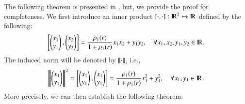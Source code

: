 \documentclass{article}
\newcommand{\Reals}[1]{{\rm I\! R}^{#1}}
\newcommand{\vertiii}[1]{{\left\vert\kern-0.25ex\left\vert\kern-0.25ex\left\vert #1 
    \right\vert\kern-0.25ex\right\vert\kern-0.25ex\right\vert}}
\theoremstyle{definition}
\begin{document}
The following theorem is presented in \cite{bramble1997analysis}, but, we provide the proof for completeness. We first introduce an inner product $[\cdot,\cdot] : \Reals{2} \mapsto \Reals{}$ defined by the following:
\begin{equation}
\left [ \begin{pmatrix} x_1 \\ y_1 \end{pmatrix}, \begin{pmatrix} x_2 \\ y_2 \end{pmatrix} \right ]  = \frac{\rho_1(r)}{1 + \rho_1(r)} x_1 x_2 + y_1 y_2, \quad \forall x_1, x_2,  y_1, y_2 \in \Reals{}.  
\end{equation}
The induced norm will be denoted by $\vertiii{\cdot}$, i.e., 
\begin{equation}
\vertiii{\begin{pmatrix} x_1 \\ y_1 \end{pmatrix}}^2 = \left [ \begin{pmatrix} x_1 \\ y_1 \end{pmatrix}, \begin{pmatrix} x_1 \\ y_1 \end{pmatrix} \right ]  = \frac{\rho_1(r)}{1 + \rho_1(r)} x_1^2 + y_1^2, \quad \forall x_1, y_1 \in \Reals{}.  
\end{equation}
More precisely, we can then establish the following theorem: 
\end{document}

